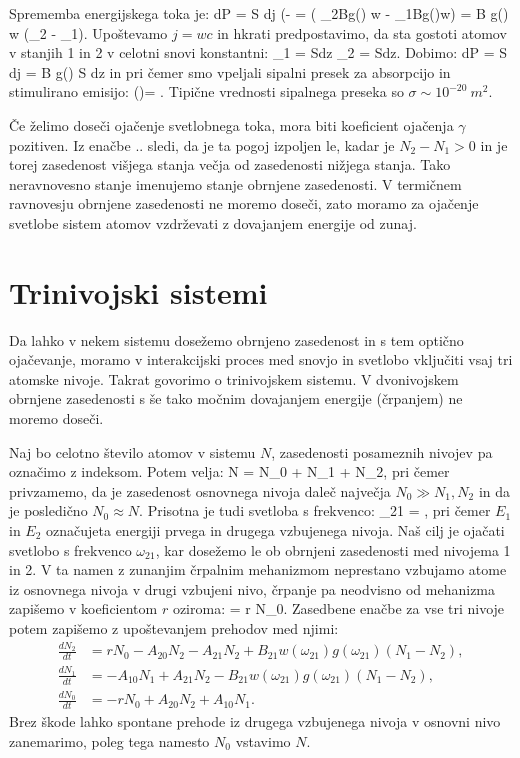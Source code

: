 Sprememba energijskega toka je:
\beq
dP = S dj \hslash \omega \left(-  = 
\hslash \omega \left( _2Bg(\omega) w - _1Bg(\omega)w\right) = 
\hslash \omega B g(\omega) w (_2 - _1\right).
\eeq
Upoštevamo $j = wc$ in hkrati predpostavimo, da sta gostoti atomov v stanjih 1 in 2 v celotni
snovi konstantni:
\beq
{}_1 = Sdz \qquad {}\qquad {}_2 = Sdz.
\eeq
Dobimo:
\beq
dP = S dj = \hslash \omega B g(\omega) S dz
\eeq
in
pri čemer smo vpeljali sipalni presek za absorpcijo in stimulirano emisijo:
\beq
\sigma (\omega)= .
\eeq
Tipične vrednosti sipalnega preseka so $\sigma \sim 10^{-20}~\si{m^2}$.

Če želimo doseči ojačenje svetlobnega toka, mora biti koeficient ojačenja $\gamma$ 
pozitiven. Iz enačbe .. sledi, da je ta pogoj izpoljen le, kadar je $N_2-N_1>0$
in je torej zasedenost višjega stanja večja od zasedenosti nižjega stanja. 
Tako neravnovesno stanje imenujemo stanje obrnjene zasedenosti. V termičnem 
ravnovesju obrnjene zasedenosti ne moremo doseči, zato moramo za ojačenje svetlobe
sistem atomov vzdrževati z dovajanjem energije od zunaj.

\section{Trinivojski sistemi}
Da lahko v nekem sistemu dosežemo obrnjeno zasedenost in s tem optično ojačevanje,
moramo v interakcijski proces med snovjo in svetlobo vključiti vsaj tri atomske nivoje.
Takrat govorimo o trinivojskem sistemu. V dvonivojskem obrnjene zasedenosti s še tako
močnim dovajanjem energije (črpanjem) ne moremo doseči.

Naj bo celotno število atomov v sistemu $N$, zasedenosti posameznih nivojev pa 
označimo z indeksom. Potem velja:
\beq
N = N_0 + N_1 + N_2,
\eeq
pri čemer privzamemo, da je zasedenost osnovnega nivoja daleč največja $N_0 \gg N_1, N_2$
in da je posledično $N_0 \approx N$. Prisotna je tudi svetloba s frekvenco:
\beq
\omega_{21} = ,
\eeq
pri čemer $E_1$ in $E_2$ označujeta energiji prvega in drugega vzbujenega nivoja. Naš
cilj je ojačati svetlobo s frekvenco $\omega_{21}$, kar dosežemo le ob obrnjeni 
zasedenosti med nivojema 1 in 2.
V ta namen z zunanjim črpalnim mehanizmom neprestano vzbujamo atome iz osnovnega nivoja
v drugi vzbujeni nivo, črpanje pa neodvisno od mehanizma zapišemo v koeficientom $r$
oziroma:
\beq
{} = r N_0.
\eeq
Zasedbene enačbe za vse tri nivoje potem zapišemo z upoštevanjem prehodov med njimi:
\begin{align}
\frac{dN_2}{dt} &= rN_0 - A_{20}N_2 - A_{21}N_2 + B_{21}w(\omega_{21})g(\omega_{21}) (N_1-N_2),\\
\frac{dN_1}{dt} &= - A_{10}N_1 + A_{21}N_2 - B_{21}w(\omega_{21})g(\omega_{21}) (N_1-N_2),\\
\frac{dN_0}{dt} &= - rN_0 + A_{20}N_2 + A_{10}N_1.
\end{align}
Brez škode lahko spontane prehode iz drugega vzbujenega nivoja v osnovni nivo zanemarimo, poleg 
tega namesto $N_0$ vstavimo $N$. 


